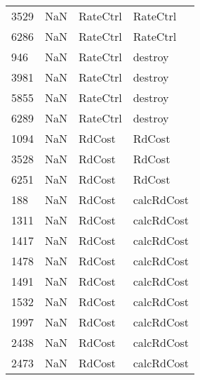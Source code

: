 \begin{tabular}{llll}
3529 &                   NaN &                   RateCtrl &                                  RateCtrl \\
6286 &                   NaN &                   RateCtrl &                                  RateCtrl \\
946  &                   NaN &                   RateCtrl &                                   destroy \\
3981 &                   NaN &                   RateCtrl &                                   destroy \\
5855 &                   NaN &                   RateCtrl &                                   destroy \\
6289 &                   NaN &                   RateCtrl &                                   destroy \\
1094 &                   NaN &                     RdCost &                                    RdCost \\
3528 &                   NaN &                     RdCost &                                    RdCost \\
6251 &                   NaN &                     RdCost &                                    RdCost \\
188  &                   NaN &                     RdCost &                                calcRdCost \\
1311 &                   NaN &                     RdCost &                                calcRdCost \\
1417 &                   NaN &                     RdCost &                                calcRdCost \\
1478 &                   NaN &                     RdCost &                                calcRdCost \\
1491 &                   NaN &                     RdCost &                                calcRdCost \\
1532 &                   NaN &                     RdCost &                                calcRdCost \\
1997 &                   NaN &                     RdCost &                                calcRdCost \\
2438 &                   NaN &                     RdCost &                                calcRdCost \\
2473 &                   NaN &                     RdCost &                                calcRdCost \\

\end{tabular}
